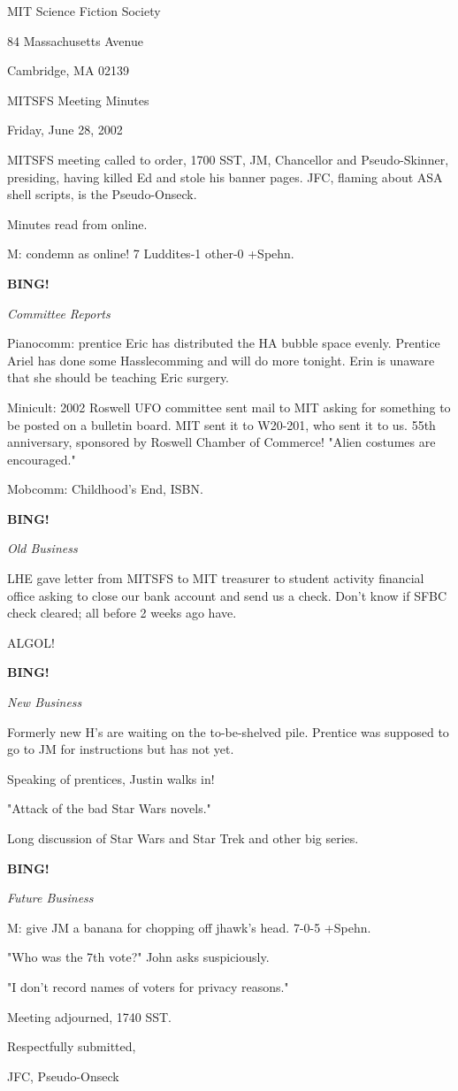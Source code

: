 \documentclass[12pt]{article}
\newcommand{\bing}{{\bf BING!} }
\newcommand{\goto}[1]{\bing \vskip 12pt \centerline{{\em{#1}}}}
\begin{document}
\begin{center}

MIT Science Fiction Society 

84 Massachusetts Avenue

Cambridge, MA 02139

\vspace{12pt}

MITSFS Meeting Minutes 

Friday, June 28, 2002

\end{center}
 
\vspace{18pt}

\setlength{\parskip}{6pt}

\noindent
MITSFS meeting called to order, 1700 SST, JM, Chancellor and Pseudo-Skinner, presiding, having killed Ed and stole his banner pages. JFC, flaming about ASA shell scripts, is the Pseudo-Onseck.

Minutes read from online.

M: condemn as online! 7 Luddites-1 other-0 +Spehn.

\goto{Committee Reports}

Pianocomm: prentice Eric has distributed the HA bubble space evenly. Prentice Ariel has done some Hasslecomming and will do more tonight. Erin is unaware that she should be teaching Eric surgery.

Minicult: 2002 Roswell UFO committee sent mail to MIT asking for something to be posted on a bulletin board. MIT sent it to W20-201, who sent it to us. 55th anniversary, sponsored by Roswell Chamber of Commerce! "Alien costumes are encouraged."

Mobcomm: Childhood's End, ISBN.

\goto{Old Business}

LHE gave letter from MITSFS to MIT treasurer to student activity financial office asking to close our bank account and send us a check. Don't know if SFBC check cleared; all before 2 weeks ago have.

ALGOL!

\goto{New Business}

Formerly new H's are waiting on the to-be-shelved pile. Prentice was supposed to go to JM for instructions but has not yet.

Speaking of prentices, Justin walks in!

"Attack of the bad Star Wars novels."

Long discussion of Star Wars and Star Trek and other big series.

\goto{Future Business}

M: give JM a banana for chopping off jhawk's head. 7-0-5 +Spehn.

"Who was the 7th vote?" John asks suspiciously.

"I don't record names of voters for privacy reasons."

\vspace{12pt}

\noindent
Meeting adjourned, 1740 SST.

\vspace{18pt}

\centerline{Respectfully submitted,}
\centerline{JFC, Pseudo-Onseck}
\end{document}

